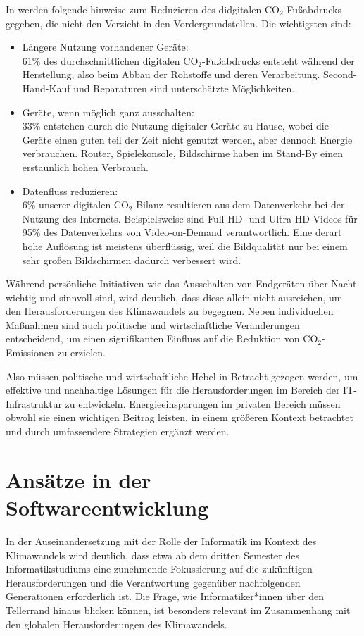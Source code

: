 \documentclass{article}
\begin{document}
In \cite{digitale_leicht_2021} werden folgende hinweise zum Reduzieren des  didgitalen CO$_2$-Fußabdrucks gegeben, die nicht den Verzicht in den Vordergrundstellen.
Die wichtigsten sind:
\begin{itemize}
	\item Längere Nutzung vorhandener Geräte:\\
	    61\% des durchschnittlichen digitalen CO$_2$-Fußabdrucks 
entsteht während der Herstellung, also  beim Abbau
der  Rohstoffe und deren Verarbeitung.  
Second-Hand-Kauf  und Reparaturen sind unterschätzte Möglichkeiten. 
  \item Geräte, wenn möglich ganz ausschalten:\\
	    33\% entstehen durch die  Nutzung digitaler Geräte zu Hause, wobei die Geräte einen guten teil der Zeit nicht genutzt werden, aber dennoch Energie verbrauchen.
			Router, Spielekonsole, Bildschirme haben  im Stand-By einen erstaunlich hohen Verbrauch.
	\item Datenfluss reduzieren:\\
	6\% unserer digitalen CO$_2$-Bilanz resultieren aus dem Datenverkehr bei der Nutzung des Internets. 
	Beispielsweise sind Full HD- und Ultra HD-Videos für 95\% des Datenverkehrs von Video-on-Demand verantwortlich. Eine derart hohe Auflösung ist meistens  überflüssig, weil die Bildqualität nur bei einem sehr großen Bildschirmen dadurch verbessert wird.
\end{itemize}



 Während persönliche Initiativen wie das Ausschalten von Endgeräten über Nacht wichtig und sinnvoll sind, wird deutlich, dass diese allein nicht ausreichen, um den Herausforderungen des Klimawandels zu begegnen. Neben individuellen Maßnahmen sind auch politische und wirtschaftliche Veränderungen entscheidend, um einen signifikanten Einfluss auf die Reduktion von CO$_2$-Emissionen zu erzielen.

Also müssen   politische und wirtschaftliche Hebel in Betracht gezogen werden, um effektive und nachhaltige Lösungen für die Herausforderungen im Bereich der IT-Infrastruktur zu entwickeln. 
Energieeinsparungen im privaten Bereich müssen  obwohl sie einen wichtigen Beitrag leisten, in einem größeren Kontext betrachtet und durch umfassendere Strategien ergänzt werden.





\section{Ansätze in der Softwareentwicklung}
In der Auseinandersetzung mit der Rolle der Informatik im Kontext des Klimawandels wird deutlich, dass etwa ab dem dritten Semester des Informatikstudiums eine zunehmende Fokussierung auf die zukünftigen Herausforderungen und die Verantwortung gegenüber nachfolgenden Generationen erforderlich ist. Die Frage, wie Informatiker*innen  über den Tellerrand hinaus blicken können, ist besonders relevant im Zusammenhang mit den globalen Herausforderungen des Klimawandels.
\end{document}
